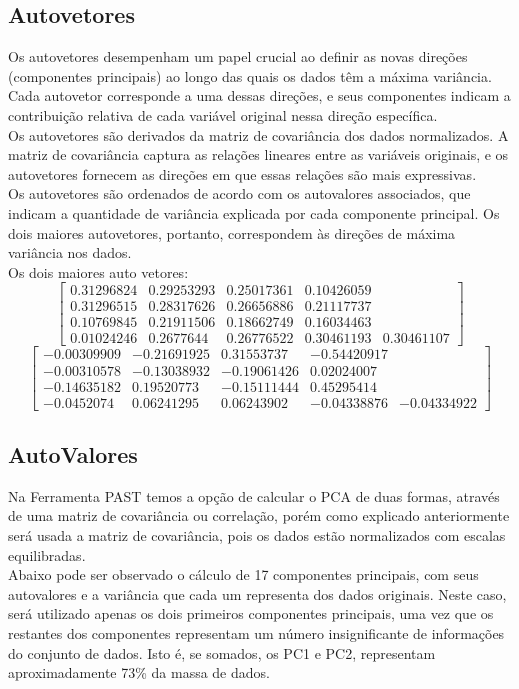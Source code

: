 \documentclass[a4paper,12pt]{article}
\begin{document}
\subsection{Autovetores}
Os autovetores desempenham um papel crucial ao definir as novas direções (componentes principais) ao longo das quais os dados têm a máxima variância. Cada autovetor corresponde a uma dessas direções, e seus componentes indicam a contribuição relativa de cada variável original nessa direção específica.\\
Os autovetores são derivados da matriz de covariância dos dados normalizados. A matriz de covariância captura as relações lineares entre as variáveis originais, e os autovetores fornecem as direções em que essas relações são mais expressivas.\\
Os autovetores são ordenados de acordo com os autovalores associados, que indicam a quantidade de variância explicada por cada componente principal. Os dois maiores autovetores, portanto, correspondem às direções de máxima variância nos dados.\\
Os dois maiores auto vetores:\\
\[
\begin{bmatrix}
0.31296824 & 0.29253293 & 0.25017361 & 0.10426059\\
0.31296515 & 0.28317626 & 0.26656886 & 0.21117737 \\
0.10769845 & 0.21911506 & 0.18662749 & 0.16034463 \\
0.01024246 & 0.2677644 & 0.26776522 & 0.30461193 & 0.30461107 
\end{bmatrix}
\]
\[
\begin{bmatrix}
-0.00309909 & -0.21691925 & 0.31553737 & -0.54420917\\
-0.00310578 & -0.13038932 & -0.19061426 & 0.02024007\\
-0.14635182 & 0.19520773 & -0.15111444 & 0.45295414\\
-0.0452074 & 0.06241295 & 0.06243902 & -0.04338876 & -0.04334922 
\end{bmatrix}
\]
\subsection{AutoValores}

Na Ferramenta PAST temos a opção de calcular o PCA de duas formas, através de uma matriz de covariância ou correlação, porém como explicado anteriormente será usada a matriz de covariância, pois os dados estão normalizados com escalas equilibradas.\\
Abaixo pode ser observado o cálculo de 17 componentes principais, com seus autovalores e a variância que cada um representa dos dados originais. Neste caso, será utilizado apenas os dois primeiros componentes principais, uma vez que os restantes dos componentes representam um número insignificante de informações do conjunto de dados. Isto é, se somados, os PC1 e PC2, representam aproximadamente 73\% da massa de dados.
\end{document}
